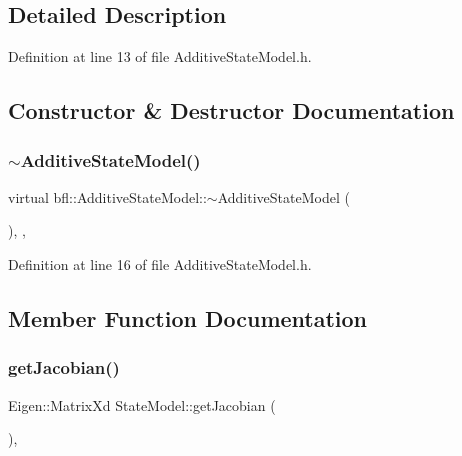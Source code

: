 \subsection{Detailed Description}


Definition at line 13 of file Additive\+State\+Model.\+h.



\subsection{Constructor \& Destructor Documentation}
\mbox{\label{classbfl_1_1AdditiveStateModel_a83769aadf851ecb2aef511dafd75e828}} 
\subsubsection{\texorpdfstring{$\sim$\+Additive\+State\+Model()}{~AdditiveStateModel()}}
{\footnotesize\ttfamily virtual bfl\+::\+Additive\+State\+Model\+::$\sim$\+Additive\+State\+Model (\begin{DoxyParamCaption}{ }\end{DoxyParamCaption})\hspace{0.3cm}{\ttfamily [inline]}, {\ttfamily [virtual]}, {\ttfamily [noexcept]}}



Definition at line 16 of file Additive\+State\+Model.\+h.



\subsection{Member Function Documentation}
\mbox{\label{classbfl_1_1StateModel_a78df4b39578345142fcfb18abaab2177}} 
\subsubsection{\texorpdfstring{get\+Jacobian()}{getJacobian()}}
{\footnotesize\ttfamily Eigen\+::\+Matrix\+Xd State\+Model\+::get\+Jacobian (\begin{DoxyParamCaption}{ }\end{DoxyParamCaption})\hspace{0.3cm}{\ttfamily [virtual]}, {\ttfamily [inherited]}}



